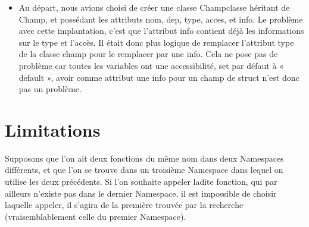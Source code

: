 \documentclass{report}
\begin{document}
\begin{itemize}
 	\item Au départ, nous avions choisi de créer une classe Champclasse héritant de Champ, et possédant les attributs nom, dep, type, acces, et info. Le problème avec cette implantation, c'est que l'attribut info contient déjà les informations sur le type et l'accès. Il était donc plus logique de remplacer l'attribut type de la classe champ pour le remplacer par une info. Cela ne pose pas de problème car toutes les variables ont une accessibilité, set par défaut à « default », avoir comme attribut une info pour un champ de struct n'est donc pas un problème.\\
\end{itemize}

\chapter{Limitations}

Supposons que l'on ait deux fonctions du même nom dans deux Namespaces différents, et que l'on se trouve dans un troisième Namespace dans lequel on utilise les deux précédents. Si l'on souhaite appeler ladite fonction, qui par ailleurs n'existe pas dans le dernier Namespace, il est impossible de choisir laquelle appeler, il s'agira de la première trouvée par la recherche (vraisemblablement celle du premier Namespace).
\end{document}
